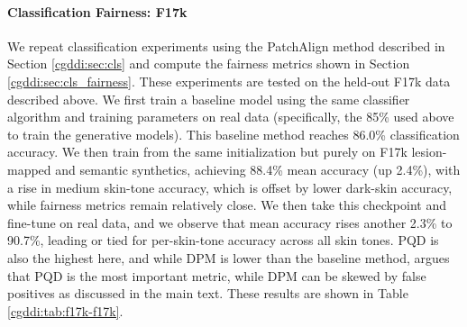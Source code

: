 \documentclass[11pt]{ucthesis}
\begin{document}
\paragraph{Classification Fairness: F17k}

We repeat classification experiments using the PatchAlign \cite{aayushman-2024} method described in Section \ref{cgddi:sec:cls} and compute the fairness metrics shown in Section \ref{cgddi:sec:cls_fairness}. These experiments are tested on the held-out F17k data described above. We first train a baseline model using the same classifier algorithm and training parameters on real data (specifically, the 85\% used above to train the generative models). This baseline method reaches 86.0\% classification accuracy. We then train from the same initialization but purely on F17k lesion-mapped and semantic synthetics, achieving 88.4\% mean accuracy (up 2.4\%), with a rise in medium skin-tone accuracy, which is offset by lower dark-skin accuracy, while fairness metrics remain relatively close. We then take this checkpoint and fine-tune on real data, and we observe that mean accuracy rises another 2.3\% to 90.7\%, leading or tied for per-skin-tone accuracy across all skin tones. PQD is also the highest here, and while DPM is lower than the baseline method, \cite{aayushman-2024} argues that PQD is the most important metric, while DPM can be skewed by false positives as discussed in the main text. These results are shown in Table \ref{cgddi:tab:f17k-f17k}.
\begin{table}[h]
\centering
\caption{F17k-trained models evaluated on the F17k test set. Baseline is trained on real data.}
\label{cgddi:tab:f17k-f17k}
\end{table}
\end{document}
